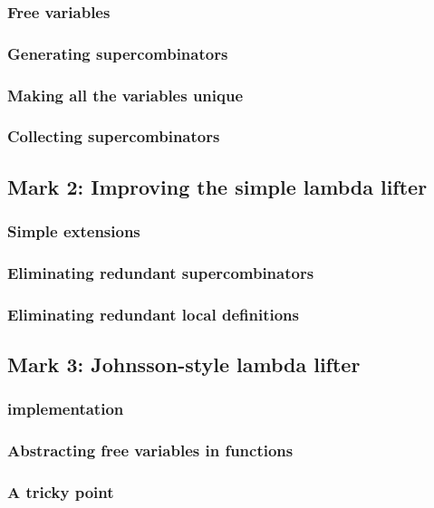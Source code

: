 \documentclass{jarticle}
\begin{document}
\subsubsection{Free variables}
\subsubsection{Generating supercombinators}
\subsubsection{Making all the variables unique}
\subsubsection{Collecting supercombinators}
\newpage

\subsection{Mark 2: Improving the simple lambda lifter}
\subsubsection{Simple extensions}
\subsubsection{Eliminating redundant supercombinators}
\subsubsection{Eliminating redundant local definitions}
\newpage

\subsection{Mark 3: Johnsson-style lambda lifter}
\subsubsection{implementation}
\subsubsection{Abstracting free variables in functions}
\subsubsection{A tricky point \dag}
\newpage
\end{document}
